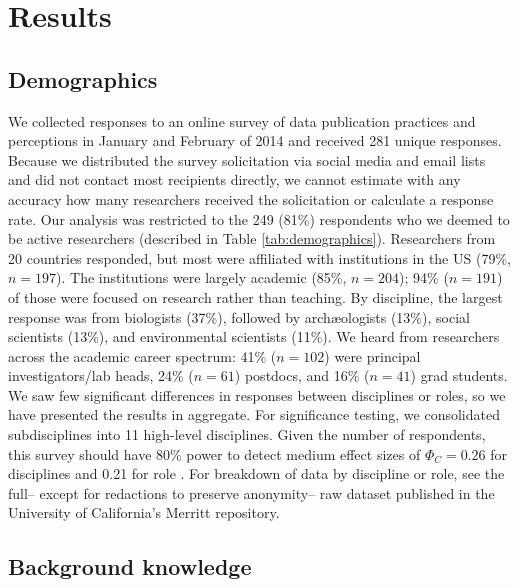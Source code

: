\documentclass[10pt]{article}
\begin{document}
\section*{Results}

\subsection*{Demographics}

We collected responses to an online survey of data publication practices and perceptions in January and February of 2014 and received 281 unique responses.
Because we distributed the survey solicitation via social media and email lists and did not contact most recipients directly, we cannot estimate with any accuracy how many researchers received the solicitation or calculate a response rate.
Our analysis was restricted to the 249 (81\%) respondents who we deemed to be active researchers (described in Table \ref{tab:demographics}).
Researchers from 20 countries responded, but most were affiliated with institutions in the US (79\%, $n=197$).
The institutions were largely academic (85\%, $n=204$); 94\% ($n=191$) of those were focused on research rather than teaching. 
By discipline, the largest response was from biologists (37\%), followed by arch{\ae}ologists (13\%), social scientists (13\%), and environmental scientists (11\%).
We heard from researchers across the academic career spectrum: 41\% ($n=102$) were principal investigators/lab heads, 24\% ($n=61$) postdocs, and 16\% ($n=41$) grad students.
We saw few significant differences in responses between disciplines or roles, so we have presented the results in aggregate.
For significance testing, we consolidated subdisciplines into 11 high-level disciplines.
Given the number of respondents, this survey should have 80\% power to detect medium effect sizes of $\Phi_{C}=0.26$ for disciplines and 0.21 for role \cite{cohen_statistical_1988}.
For breakdown of data by discipline or role, see the full-- except for redactions to preserve anonymity-- raw dataset published in the University of California's Merritt repository\cite{kratz_researcher_2014}.

\subsection*{Background knowledge}
\end{document}
